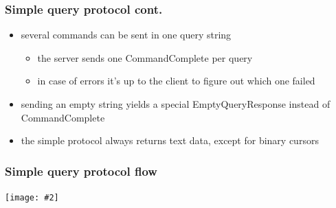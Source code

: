 \documentclass{beamer}
\newcommand{\mscdiagram}[2][1]{
  \begin{center}
    \texttt{[image: \#2]}
  \end{center}
}
\begin{document}
\begin{frame}
  \frametitle{Simple query protocol cont.}

  \begin{itemize}
  \item \alert{several commands} can be sent in one query string
    \begin{itemize}
    \item the server sends one CommandComplete per query
    \item in case of errors it's up to the client to figure out which one failed
    \end{itemize}
  \item sending an empty string yields a special EmptyQueryResponse instead of
    CommandComplete
  \item the simple protocol \alert{always} returns text data, except for binary cursors
  \end{itemize}
\end{frame}

\begin{frame}
  \frametitle{Simple query protocol flow}

  \mscdiagram{simple-query-protocol}
\end{frame}
\end{document}
